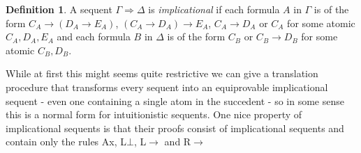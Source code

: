 \documentclass[a4paper,12pt]{article}
\theoremstyle{definition}
\theoremstyle{definition}
\theoremstyle{definition}
\theoremstyle{definition}
\theoremstyle{definition}
\newtheorem{definition}[theorem]{Definition}
\theoremstyle{definition}
\begin{document}
	\begin{definition}
		A sequent $\Gamma\Rightarrow \Delta$ is \textit{implicational} if each formula $A$ in $\Gamma$ is of the form $C_A\to (D_A\to E_A)$, $(C_A\to D_A)\to E_A$, $C_A\to D_A$ or $C_A$ for some atomic $C_A, D_A, E_A$ and each formula $B$ in $\Delta$ is of the form $C_B$ or $C_B\to D_B$ for some atomic $C_B, D_B$.
	\end{definition}

	While at first this might seems quite restrictive we can give a translation procedure that transforms every sequent into an equiprovable implicational sequent - even one containing a single atom in the succedent - so in some sense this is a normal form for intuitionistic sequents. One nice property of implicational sequents is that their proofs consist of implicational sequents and contain only the rules Ax, L$\bot$, L$\to$ and R$\to$
	
\end{document}
